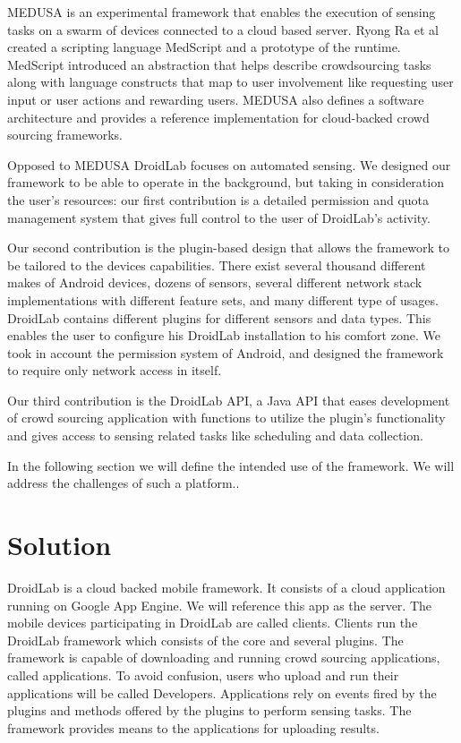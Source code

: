 \documentclass[conference,letterpaper]{IEEEtran}
\begin{document}
MEDUSA is an experimental framework that enables the execution of sensing tasks on a swarm of devices connected to a cloud based server. Ryong Ra et al created a scripting language MedScript and a prototype of the runtime. MedScript introduced an abstraction that helps describe crowdsourcing tasks along with language constructs that map to user involvement like requesting user input or user actions and rewarding users. MEDUSA also defines a software architecture and provides a reference implementation for cloud-backed crowd sourcing frameworks.

Opposed to MEDUSA DroidLab focuses on automated sensing. We designed our framework to be able to operate in the background, but taking in consideration the user's resources: our first contribution is a detailed permission and quota management system that gives full control to the user of DroidLab's activity.

Our second contribution is the plugin-based design that allows the framework to be tailored to the devices capabilities. There exist several thousand different makes of Android devices, dozens of sensors, several different network stack implementations with different feature sets, and many different type of usages. DroidLab contains different plugins for different sensors and data types. This enables the user to configure his DroidLab installation to his comfort zone. We took in account the permission system of Android, and designed the framework to require only network access in itself.

Our third contribution is the DroidLab API, a Java API that eases development of crowd sourcing application with functions to utilize the plugin's functionality and gives access to sensing related tasks like scheduling and data collection.

In the following section we will define the intended use of the framework. We will address the challenges of such a platform..
\section{Solution}
\label{sec:solution}
DroidLab is a cloud backed mobile framework. It consists of a cloud application running on Google App Engine. We will reference this app as the server. The mobile devices participating in DroidLab are called clients. Clients run the DroidLab framework which consists of the core and several plugins. The framework is capable of downloading and running crowd sourcing applications, called applications. To avoid confusion, users who upload and run their applications will be called Developers. Applications rely on events fired by the plugins and methods offered by the plugins to perform sensing tasks. The framework provides means to the applications for uploading results.
\end{document}
